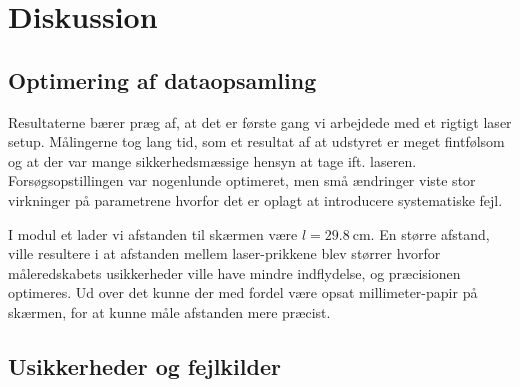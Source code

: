 \documentclass[main]{subfiles}
\begin{document}
\section{Diskussion}
\subsection{Optimering af dataopsamling}
Resultaterne bærer præg af, at det er første gang vi arbejdede med et rigtigt laser setup. Målingerne tog lang tid, som et resultat af at udstyret er meget fintfølsom og at der var mange sikkerhedsmæssige hensyn at tage ift. laseren. Forsøgsopstillingen var nogenlunde optimeret, men små ændringer viste stor virkninger på parametrene hvorfor det er oplagt at introducere systematiske fejl.

I modul et lader vi afstanden til skærmen være $l = \SI{29,8}{\centi\meter}$. En større afstand, ville resultere i at afstanden mellem laser-prikkene blev størrer hvorfor måleredskabets usikkerheder ville have mindre indflydelse, og præcisionen optimeres. Ud over det kunne der med fordel være opsat millimeter-papir på skærmen, for at kunne måle afstanden mere præcist.
\subsection{Usikkerheder og fejlkilder}
\end{document}

